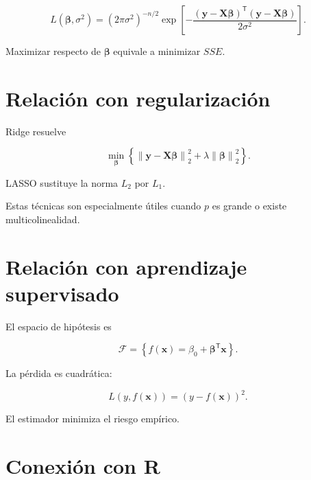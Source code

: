 \documentclass[
  spanish,
  11pt,
  letterpaper,
  DIV=11,
  numbers=noendperiod]{scrreprt}
\theoremstyle{definition}
\theoremstyle{plain}
\theoremstyle{definition}
\theoremstyle{remark}
\begin{document}
\[
L(
\boldsymbol{\beta},
\sigma^2
)
=
(2\pi\sigma^2)^{-n/2}
\exp
\left[
-\frac{
(\mathbf{y}-\mathbf{X}\boldsymbol{\beta})^{\mathsf T}
(\mathbf{y}-\mathbf{X}\boldsymbol{\beta})
}{
2\sigma^2
}
\right].
\]

Maximizar respecto de \(\boldsymbol{\beta}\) equivale a minimizar
\(SSE\).

\section{Relación con
regularización}\label{relaciuxf3n-con-regularizaciuxf3n}

Ridge resuelve

\[
\min_{\boldsymbol{\beta}}
\left\{
\left\|
\mathbf{y}
-
\mathbf{X}\boldsymbol{\beta}
\right\|_2^2
+
\lambda
\left\|
\boldsymbol{\beta}
\right\|_2^2
\right\}.
\]

LASSO sustituye la norma \(L_2\) por \(L_1\).

Estas técnicas son especialmente útiles cuando \(p\) es grande o existe
multicolinealidad.

\section{Relación con aprendizaje
supervisado}\label{relaciuxf3n-con-aprendizaje-supervisado-1}

El espacio de hipótesis es

\[
\mathcal{F}
=
\left\{
f(\mathbf{x})
=
\beta_0
+
\boldsymbol{\beta}^{\mathsf T}\mathbf{x}
\right\}.
\]

La pérdida es cuadrática:

\[
L(y,f(\mathbf{x}))
=
\left(
y-f(\mathbf{x})
\right)^2.
\]

El estimador minimiza el riesgo empírico.

\section{Conexión con R}\label{conexiuxf3n-con-r-9}
\end{document}
